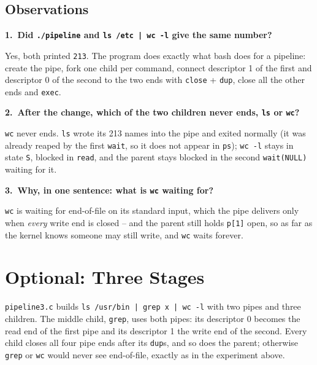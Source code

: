 \documentclass[12pt,a4paper]{article}
\newcommand{\qa}[2]{%
  \par\needspace{5\baselineskip}\medskip
  \noindent\textbf{#1.~#2}\par\smallskip\noindent}
\begin{document}
\subsection*{Observations}

\qa{1}{Did \texttt{./pipeline} and \texttt{ls /etc | wc -l} give the same number?}
Yes, both printed \texttt{213}. The program does exactly what bash does for a pipeline: create the pipe, fork one child per command, connect descriptor 1 of the first and descriptor 0 of the second to the two ends with \texttt{close} + \texttt{dup}, close all the other ends and \texttt{exec}.

\qa{2}{After the change, which of the two children never ends, \texttt{ls} or \texttt{wc}?}
\texttt{wc} never ends. \texttt{ls} wrote its 213 names into the pipe and exited normally (it was already reaped by the first \texttt{wait}, so it does not appear in \texttt{ps}); \texttt{wc -l} stays in state \texttt{S}, blocked in \texttt{read}, and the parent stays blocked in the second \texttt{wait(NULL)} waiting for it.

\qa{3}{Why, in one sentence: what is \texttt{wc} waiting for?}
\texttt{wc} is waiting for end-of-file on its standard input, which the pipe delivers only when \textit{every} write end is closed -- and the parent still holds \texttt{p[1]} open, so as far as the kernel knows someone may still write, and \texttt{wc} waits forever.

\newpage
\section{Optional: Three Stages}

\texttt{pipeline3.c} builds \texttt{ls /usr/bin | grep x | wc -l} with two pipes and three children. The middle child, \texttt{grep}, uses both pipes: its descriptor 0 becomes the read end of the first pipe and its descriptor 1 the write end of the second. Every child closes all four pipe ends after its \texttt{dup}s, and so does the parent; otherwise \texttt{grep} or \texttt{wc} would never see end-of-file, exactly as in the experiment above.
\end{document}
